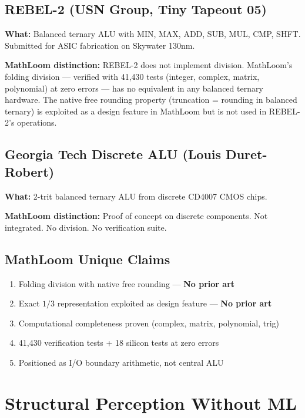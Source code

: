 \documentclass[11pt, a4paper]{article}
\newcommand{\nopriorart}{\textcolor{gap-red}{\textbf{No prior art}}}
\begin{document}
\subsection{REBEL-2 (USN Group, Tiny Tapeout 05)}

\textbf{What:} Balanced ternary ALU with MIN, MAX, ADD, SUB, MUL,
CMP, SHFT. Submitted for ASIC fabrication on Skywater 130nm.

\textbf{MathLoom distinction:} REBEL-2 does not implement division.
MathLoom's folding division --- verified with 41,430 tests (integer,
complex, matrix, polynomial) at zero errors --- has no equivalent in
any balanced ternary hardware. The native free rounding property
(truncation = rounding in balanced ternary) is exploited as a design
feature in MathLoom but is not used in REBEL-2's operations.

\subsection{Georgia Tech Discrete ALU (Louis Duret-Robert)}

\textbf{What:} 2-trit balanced ternary ALU from discrete CD4007 CMOS
chips.

\textbf{MathLoom distinction:} Proof of concept on discrete components.
Not integrated. No division. No verification suite.

\subsection{MathLoom Unique Claims}

\begin{enumerate}[nosep]
  \item Folding division with native free rounding --- \nopriorart
  \item Exact $1/3$ representation exploited as design feature --- \nopriorart
  \item Computational completeness proven (complex, matrix, polynomial, trig)
  \item 41,430 verification tests + 18 silicon tests at zero errors
  \item Positioned as I/O boundary arithmetic, not central ALU
\end{enumerate}

\section{Structural Perception Without ML}
\end{document}
